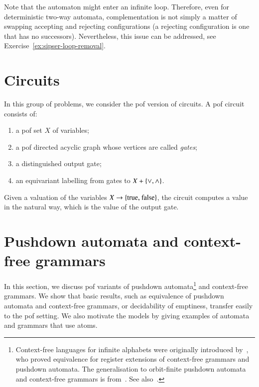 Note that the automaton might enter an infinite loop. Therefore, even for deterministic two-way automata, complementation is not simply a matter of swapping accepting and rejecting configurations (a rejecting configuration is one that has no successors). Nevertheless, this issue can be addressed, see Exercise~\ref{ex:sipser-loop-removal}.


\exercisepart


\section{Circuits}
\label{sec:circuits}
In this group of problems, we consider the pof version of circuits.     A pof circuit consists of:
\begin{enumerate}
    \item a pof set $X$ of variables;
    \item a pof directed acyclic graph whose vertices are called  \emph{gates};
    \item a distinguished output gate;
    \item an equivariant labelling from gates to $X + \{\lor,\land\}$.
\end{enumerate}
Given a valuation of the variables $X \to \{\text{true, false}\}$, the circuit computes a value in the natural way, which is the value of the output gate.

\exercisepart



\section{Pushdown automata and context-free grammars}
\label{sec:cfl}
In this section, we discuss pof variants of  pushdown automata\footnote{Context-free languages for infinite alphabets were originally introduced by~\cite{DBLP:journals/acta/ChengK98}, who proved equivalence for register extensions of context-free grammars and pushdown automata. The generalisation to orbit-finite pushdown automata and context-free grammars is from~\cite{DBLP:journals/corr/BojanczykKL14}. See also~\cite{DBLP:conf/mfcs/MurawskiRT14,DBLP:conf/csl/ClementeL15,DBLP:conf/lics/ClementeL15}. } and context-free grammars.  We show that basic results, such as equivalence of pushdown automata and context-free grammars, or decidability of emptiness,  transfer easily to the pof setting. We also motivate the models by giving examples of automata and grammars that use atoms. 

